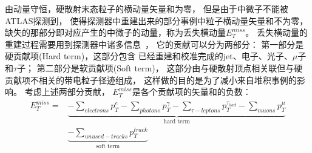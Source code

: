 由动量守恒，硬散射末态粒子的横动量矢量和为零，
但是由于中微子不能被ATLAS探测到，
使得探测器中重建出来的部分事例中粒子横动量矢量和不为零，
缺失的那部分即对应产生的中微子的动量，称为丢失横动量$E_T^{miss}$。
丢失横动量的重建过程需要用到探测器中诸多信息~\cite{LEPTON9}，
它的贡献可以分为两部分：
第一部分是硬贡献项(Hard term)，这部分包含
已经重建和校准完成的jet、电子、光子、$\mu$子和$\tau$子；
第二部分是软贡献项(Soft term)，
这部分由与硬散射顶点相关联但与硬贡献项不相关的带电粒子径迹组成，
这样做的目的是为了减小来自堆积事例的影响。
考虑上述两部分贡献，
$E_T^{miss}$是各个贡献项的矢量和的负数：
\begin{equation} 
\label{eq:MISSET}
\begin{split}
E_T^{miss}=&\underbrace{ -\sum_{electrons} p_T^e -\sum_{photons} p_T^{\gamma}  -\sum_{\tau -leptons} p_T^{\tau_{had}}  -\sum_{muons} p_T^{\mu} }_\text{hard term}
\\
&\underbrace{  -\sum_{unused-tracks} p_T^{track} }_\text{soft term}
\end{split}
\end{equation}
















